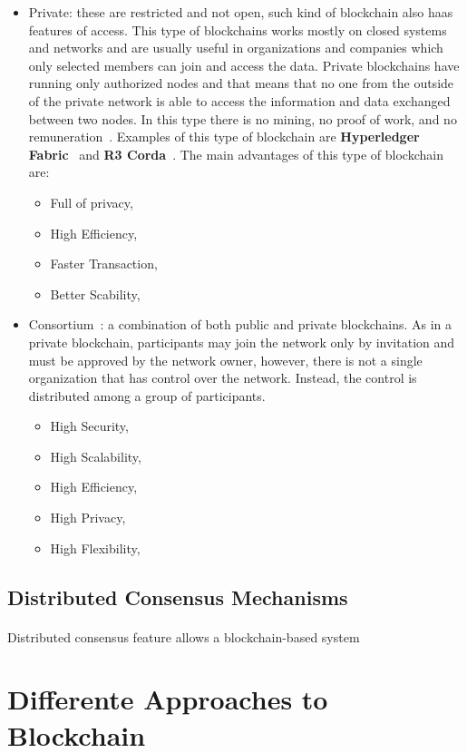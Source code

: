 \begin{itemize}
    \item {Private}: these are restricted and not open, such kind of blockchain also haas features of access. This type of blockchains works mostly on closed systems and networks and are usually
          useful in organizations and companies which only selected members can join and access the data. Private blockchains have running only authorized nodes and that means that no one from the outside
          of the private network is able to access the information and data exchanged between two nodes. In this type there is no mining, no proof of work, and no remuneration~\cite{guegan:halshs-01524440}. 
          Examples of this type of blockchain are \textbf{Hyperledger Fabric}~\cite{hyperLedger} and \textbf{R3 Corda}~\cite{r3Corda}.
          The main advantages of this type of blockchain are:
          \begin{itemize}
              \item Full of privacy,
              \item High Efficiency,
              \item Faster Transaction,
              \item Better Scability,
          \end{itemize}
    \item {Consortium~\cite{KASI20221}}: a combination of both public and private blockchains. As in a private blockchain, participants may join the network only by invitation and must be approved by the network owner, however,
          there is not a single organization that has control over the network. Instead, the control is distributed among a group of participants.
          \begin{itemize}
              \item High Security,
              \item High Scalability,
              \item High Efficiency,
              \item High Privacy,
              \item High Flexibility,
          \end{itemize}

\end{itemize}

\subsection*{Distributed Consensus Mechanisms}\label{subsec:distributed-consensus-mechanisms}
\paragraph{}

Distributed consensus feature allows a blockchain-based system


\section{Differente Approaches to Blockchain}\label{sec:different-approaches-to-blockchain}
\paragraph{}




